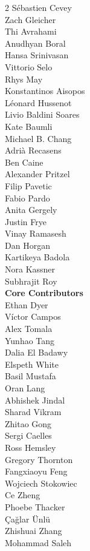\begin{multicols}{2}
Sébastien Cevey \\
Zach Gleicher \\
Thi Avrahami \\
Anudhyan Boral \\
Hansa Srinivasan \\
Vittorio Selo \\
Rhys May \\
Konstantinos Aisopos \\
Léonard Hussenot \\
Livio Baldini Soares \\
Kate Baumli \\
Michael B. Chang \\
Adrià Recasens \\
Ben Caine \\
Alexander Pritzel \\
Filip Pavetic \\
Fabio Pardo \\
Anita Gergely \\
Justin Frye \\
Vinay Ramasesh \\
Dan Horgan \\
Kartikeya Badola \\
Nora Kassner \\
Subhrajit Roy \\
\noindent
\textbf{Core Contributors} \\
Ethan Dyer \\
Víctor Campos \\
Alex Tomala \\
Yunhao Tang \\
Dalia El Badawy \\
Elspeth White \\
Basil Mustafa \\
Oran Lang \\
Abhishek Jindal \\
Sharad Vikram \\
Zhitao Gong \\
Sergi Caelles \\
Ross Hemsley \\
Gregory Thornton \\
Fangxiaoyu Feng \\
Wojciech Stokowiec \\
Ce Zheng \\
Phoebe Thacker \\
Çağlar Ünlü \\
Zhishuai Zhang \\
Mohammad Saleh \\

\end{multicols}
